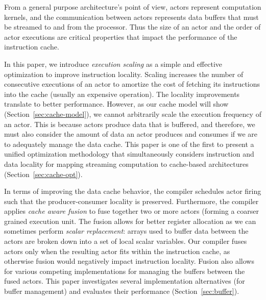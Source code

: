 From a general purpose architecture's point of view, actors represent
computation kernels, and the communication between actors represents
data buffers that must be streamed to and from the processor. Thus
the size of an actor and the order of actor executions are critical
properties that impact the performance of the instruction cache.  

In this paper, we introduce {\it execution scaling} as a simple and
effective optimization to improve instruction locality. Scaling 
increases the number of consecutive executions of an actor to
amortize the cost of fetching its instructions into the cache (usually
an expensive operation). The locality improvements translate to better
performance. However, as our cache model will show
(Section~\ref{sec:cache-model}), we  cannot arbitrarily scale the
execution frequency of an actor. This is because actors produce data
that is buffered, and therefore, we must also consider the amount of
data an actor produces and consumes if we are to adequately manage the
data cache.  This paper is one of the first to present a unified
optimization methodology that simultaneously considers instruction and
data locality for mapping streaming computation to cache-based
architectures (Section~\ref{sec:cache-opt}). 

In terms of improving the data cache behavior, the compiler schedules
actor firing such that the producer-consumer locality is
preserved. Furthermore,  the compiler applies  {\it cache aware fusion}
to fuse together two or more actors (forming a coarser grained
execution unit. The fusion allows for better register allocation as we
can sometimes perform {\it scalar replacement}: arrays used to buffer
data between the actors are broken down into a set of local scalar
variables. Our compiler fuses actors only when the resulting actor
fits within the instruction cache, as otherwise fusion would
negatively impact instruction locality. Fusion also allows for
various competing implementations for managing the buffers between the
fused actors.  This paper investigates several implementation
alternatives (for buffer management) and evaluates their performance
(Section~\ref{sec:buffer}).


